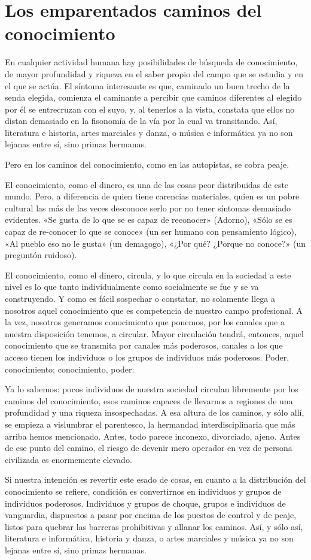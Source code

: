 \chapter{Los emparentados caminos del conocimiento}
En cualquier actividad humana hay posibilidades de búsqueda de conocimiento, de mayor profundidad y riqueza en el saber propio del campo que se estudia y en el que se actúa. El síntoma interesante es que, caminado un buen trecho de la senda elegida, comienza el caminante a percibir que caminos diferentes al elegido por él se entrecruzan con el suyo, y, al tenerlos a la vista, constata que ellos no distan demasiado en la fisonomía de la vía por la cual va transitando. Así, literatura e historia, artes marciales y danza, o música e informática ya no son lejanas entre sí, sino primas hermanas.

Pero en los caminos del conocimiento, como en las autopistas, se cobra peaje.

El conocimiento, como el dinero, es una de las cosas peor distribuidas de este mundo. Pero, a diferencia de quien tiene carencias materiales, quien es un pobre cultural las más de las veces desconoce serlo por no tener síntomas demasiado evidentes. «Se gusta de lo que se es capaz de reconocer» (Adorno), «Sólo se es capaz de re-conocer lo que se conoce» (un ser humano con pensamiento lógico), «Al pueblo eso no le gusta» (un demagogo), «¿Por qué? ¿Porque no conoce?» (un preguntón ruidoso).

El conocimiento, como el dinero, circula, y lo que circula en la sociedad a este nivel es lo que tanto individualmente como socialmente se fue y se va construyendo. Y como es fácil sospechar o constatar, no solamente llega a nosotros aquel conocimiento que es competencia de nuestro campo profesional. A la vez, nosotros generamos conocimiento que ponemos, por los canales que a nuestra disposición tenemos, a circular. Mayor circulación tendrá, entonces, aquel conocimiento que se transmita por canales más poderosos, canales a los que acceso tienen los individuos o los grupos de individuos más poderosos. Poder, conocimiento; conocimiento, poder.

Ya lo sabemos: pocos individuos de nuestra sociedad circulan libremente por los caminos del conocimiento, esos caminos capaces de llevarnos a regiones de una profundidad y una riqueza insospechadas. A esa altura de los caminos, y sólo allí, se empieza a vislumbrar el parentesco, la hermandad interdisciplinaria que más arriba hemos mencionado. Antes, todo parece inconexo, divorciado, ajeno. Antes de ese punto del camino, el riesgo de devenir mero operador en vez de persona civilizada es enormemente elevado.

Si nuestra intención es revertir este esado de cosas, en cuanto a la distribución del conocimiento se refiere, condición es convertirnos en individuos y grupos de individuos poderosos. Individuos y grupos de choque, grupos e individuos de vanguardia, dispuestos a pasar por encima de los puestos de control y de peaje, listos para quebrar las barreras prohibitivas y allanar los caminos. Así, y sólo así, literatura e informática, historia y danza, o artes marciales y música ya no son lejanas entre sí, sino primas hermanas.